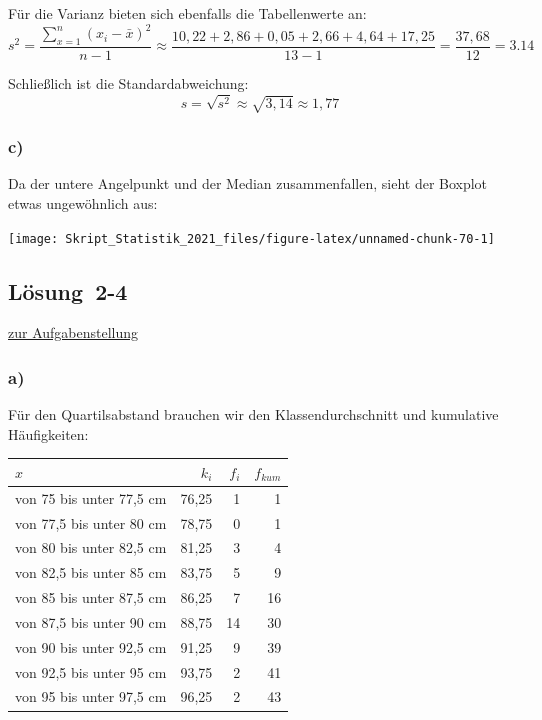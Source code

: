 \documentclass[
  11pt,
  ngerman,
  a4paper,
]{report}
\begin{document}
Für die Varianz bieten sich ebenfalls die Tabellenwerte an: \[s^2=\frac{\sum\limits_{x=1}^n(x_i-\bar{x})^2}{n-1}\approx\frac{10,22+ 2,86+ 0,05+ 2,66+ 4,64+17,25}{13-1}=\frac{37,68}{12}=3.14\]

Schließlich ist die Standardabweichung: \[s=\sqrt{s^2}\approx\sqrt{3,14}\approx1,77\]

\hypertarget{c-4}{%
\subsubsection{c)}\label{c-4}}

Da der untere Angelpunkt und der Median zusammenfallen, sieht der Boxplot etwas ungewöhnlich aus:

\begin{center}\texttt{[image: Skript\_Statistik\_2021\_files/figure-latex/unnamed-chunk-70-1]} \end{center}

\hypertarget{loesung-2-4}{%
\subsection{Lösung~2-4}\label{loesung-2-4}}

\protect\hyperlink{aufgabe-2-4}{zur Aufgabenstellung}

\hypertarget{a-5}{%
\subsubsection{a)}\label{a-5}}

Für den Quartilsabstand brauchen wir den Klassendurchschnitt und kumulative Häufigkeiten:

\begin{table}[H]
\centering
\begin{tabular}{lrrr}
\toprule
\textbf{$x$} & \textbf{$k_i$} & \textbf{$f_i$} & \textbf{$f_{kum}$}\\
\midrule
von 75 bis unter 77,5 cm & 76,25 & 1 & 1\\
von 77,5 bis unter 80 cm & 78,75 & 0 & 1\\
von 80 bis unter 82,5 cm & 81,25 & 3 & 4\\
von 82,5 bis unter 85 cm & 83,75 & 5 & 9\\
von 85 bis unter 87,5 cm & 86,25 & 7 & 16\\
von 87,5 bis unter 90 cm & 88,75 & 14 & 30\\
von 90 bis unter 92,5 cm & 91,25 & 9 & 39\\
von 92,5 bis unter 95 cm & 93,75 & 2 & 41\\
von 95 bis unter 97,5 cm & 96,25 & 2 & 43\\
\bottomrule
\end{tabular}
\end{table}
\end{document}
